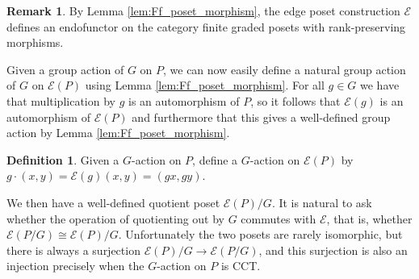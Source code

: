 \documentclass[10 pt]{amsart}
\theoremstyle{plain}
\newtheorem{prop}[thm]{Proposition}
\theoremstyle{definition}
\newtheorem{defn}[thm]{Definition}
\newtheorem{rem}[thm]{Remark}
\theoremstyle{remark}
\numberwithin{equation}{section}
\newcommand{\id}{\mathrm{id}}
\begin{document}
%

\begin{rem}
By Lemma \ref{lem:Ff_poset_morphism}, the edge poset construction $\mathcal{E}$ defines an endofunctor on the category finite graded posets with rank-preserving morphisms.
\end{rem}



Given a group action of $G$ on $P$, we can now easily define a natural group action of $G$ on $\mathcal E(P)$ using Lemma \ref{lem:Ff_poset_morphism}.  For all $g\in G$ we have that multiplication by $g$ is an automorphism of $P$, so it follows that $\mathcal E(g)$ is an automorphism of $\mathcal E(P)$ and furthermore that this gives a well-defined group action by Lemma \ref{lem:Ff_poset_morphism}.

\begin{defn}\label{note:G_action_on_FP}
Given a $G$-action on $P$, define a $G$-action on $\mathcal E(P)$ by $g\cdot (x,y) = \mathcal{E}(g)(x,y) = (gx,gy)$.
\end{defn}

We then have a well-defined quotient poset $\mathcal E(P)/G$.  It is natural to ask whether the operation of quotienting out by $G$ commutes with $\mathcal E$, that is, whether $\mathcal E(P/G) \cong \mathcal E(P)/G$.  Unfortunately the two posets are rarely isomorphic, but there is always a surjection $\mathcal E(P)/G\rightarrow \mathcal E(P/G)$, and this surjection is also an injection precisely when the $G$-action on $P$ is CCT.
\end{document}
